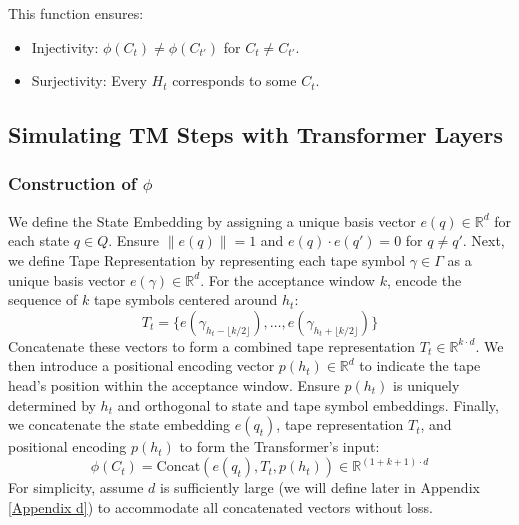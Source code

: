 This function ensures:
\begin{itemize}
    \item {Injectivity}: \( \phi(C_t) \neq \phi(C_{t'}) \) for \( C_t \neq C_{t'} \).
    \item {Surjectivity}: Every \( H_t \) corresponds to some \( C_t \).
\end{itemize}



\subsection{Simulating TM Steps with Transformer Layers} \label{appendix:a4}

\subsubsection{Construction of \( \phi \)}

     We define the State Embedding by assigning a unique basis vector \( e(q) \in \mathbb{R}^d \) for each state \( q \in Q \). Ensure \( \|e(q)\| = 1 \) and \( e(q) \cdot e(q') = 0 \) for \( q \neq q' \).
     Next, we define Tape Representation by representing each tape symbol \( \gamma \in \Gamma \) as a unique basis vector \( e(\gamma) \in \mathbb{R}^d \). For the acceptance window \( k \), encode the sequence of \( k \) tape symbols centered around \( h_t \):
    \[
    T_t = \{ e(\gamma_{h_t - \lfloor k/2 \rfloor}), \dots, e(\gamma_{h_t + \lfloor k/2 \rfloor}) \}
    \]
    Concatenate these vectors to form a combined tape representation \( T_t \in \mathbb{R}^{k \cdot d} \).
   We then introduce a positional encoding vector \( p(h_t) \in \mathbb{R}^d \) to indicate the tape head's position within the acceptance window. Ensure \( p(h_t) \) is uniquely determined by \( h_t \) and orthogonal to state and tape symbol embeddings.
Finally, we concatenate the state embedding \( e(q_t) \), tape representation \( T_t \), and positional encoding \( p(h_t) \) to form the Transformer's input:
    \[
 \phi(C_t) = \text{Concat}\left( e(q_t), T_t, p(h_t) \right) \in \mathbb{R}^{(1 + k + 1) \cdot d}
    \]
    For simplicity, assume \( d \) is sufficiently large (we will define later in Appendix \ref{Appendix d}) to accommodate all concatenated vectors without loss.


